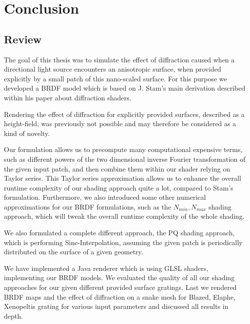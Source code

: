 \chapter{Conclusion}
\section{Review}
The goal of this thesis was to simulate the effect of diffraction caused when a directional light source encounters an anisotropic surface, when provided explicitly by a small patch of this nano-scaled surface. For this purpose we developed a BRDF model which is based on J. Stam's main derivation described within his paper about diffraction shaders. 

Rendering the effect of diffraction for explicitly provided surfaces, described as a height-field, was previously not possible and may therefore be considered as a kind of novelty.

Our formulation allows us to precompute many computational expensive terms, such as different powers of the two dimensional inverse Fourier transformation of the given input patch, and then combine them within our shader relying on Taylor series. This Taylor series approximation allows us to enhance the overall runtime complexity of our shading approach quite a lot, compared to Stam's formulation. Furthermore, we also introduced some other numerical approximations for our BRDF formulations, such as the $N_{min}, N_{max}$ shading approach, which will tweak the overall runtime complexity of the whole shading. 

We also formulated a complete different approach, the PQ shading approach, which is performing Sinc-Interpolation, assuming the given patch is periodically distributed on the surface of a given geometry. 

We have implemented a Java renderer which is using GLSL shaders, implementing our BRDF models. We evaluated the quality of all our shading approaches for our given different provided surface gratings. 
Last we rendered BRDF maps and the effect of diffraction on a snake mesh for Blazed, Elaphe, Xenopeltis grating for various input parameters and discussed all results in depth.

